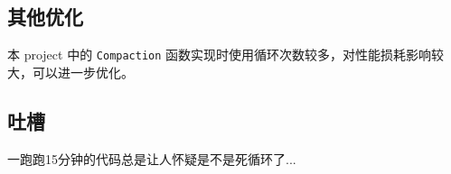 \documentclass[fontset=windows]{article}
\begin{document}
	\subsection{其他优化}
	\hspace{2em} 本 project 中的 \texttt{Compaction} 函数实现时使用循环次数较多，对性能损耗影响较大，可以进一步优化。
	
	\subsection{吐槽}
	 	\hspace{2em}一跑跑15分钟的代码总是让人怀疑是不是死循环了...
	
	
	
	
	
	
	\nocite{*}
	
\end{document}
